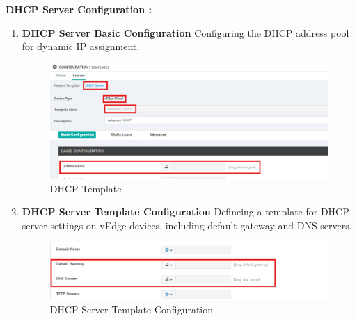 \documentclass[12pt,english]{report}
\begin{document}
\textbf{DHCP Server Configuration :}
\begin{enumerate}
    \item \textbf{DHCP Server Basic Configuration}
    Configuring the DHCP address pool for dynamic IP assignment.
\begin{figure}[H]
    \centering
    \includegraphics[width= 0.9 \textwidth]{chapitre 3/template/18.png}
    \caption{DHCP Template}
    \label{DHCP Template}
\end{figure}    
    \item \textbf{DHCP Server Template Configuration}
    Defineing a template for DHCP server settings on vEdge devices, including default gateway and DNS servers.
\begin{figure}[H]
    \centering
    \includegraphics[width= 1.1 \textwidth]{chapitre 3/template/18.5.png}
    \caption{DHCP Server Template Configuration}
    \label{DHCP Server Template Configuration}
\end{figure}
\end{enumerate}
\end{document}
